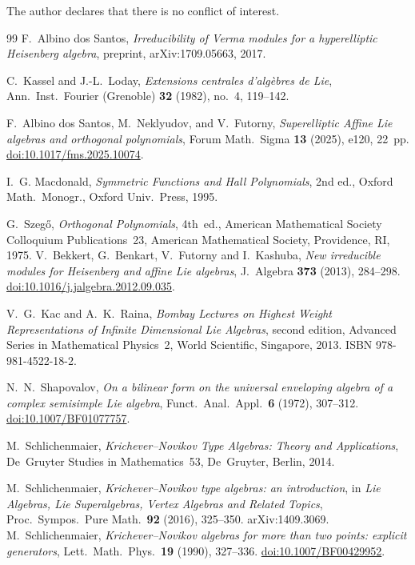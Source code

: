 \documentclass[12pt]{amsart}
\theoremstyle{plain}
\theoremstyle{definition}
\begin{document}
The author declares that there is no conflict of interest.


\begin{thebibliography}{99}
F.~Albino dos Santos,
\textit{Irreducibility of Verma modules for a hyperelliptic Heisenberg algebra},
preprint, arXiv:1709.05663, 2017.

C.~Kassel and J.-L.~Loday,
\textit{Extensions centrales d'alg\`ebres de Lie},
Ann.\ Inst.\ Fourier (Grenoble) \textbf{32} (1982), no.~4, 119--142.

F.~Albino dos Santos, M.~Neklyudov, and V.~Futorny,
\textit{Superelliptic Affine Lie algebras and orthogonal polynomials},
Forum Math.\ Sigma \textbf{13} (2025), e120, 22~pp.
\href{https://doi.org/10.1017/fms.2025.10074}{doi:10.1017/fms.2025.10074}.

I.~G. Macdonald,
\textit{Symmetric Functions and Hall Polynomials},
2nd ed., Oxford Math.\ Monogr., Oxford Univ.\ Press, 1995.

G.~Szeg\H{o},
\textit{Orthogonal Polynomials},
4th~ed., American Mathematical Society Colloquium Publications~23,
American Mathematical Society, Providence, RI, 1975.
V.~Bekkert, G.~Benkart, V.~Futorny and I.~Kashuba,
\textit{New irreducible modules for Heisenberg and affine Lie algebras},
J.~Algebra \textbf{373} (2013), 284--298.
\href{https://doi.org/10.1016/j.jalgebra.2012.09.035}{doi:10.1016/j.jalgebra.2012.09.035}.

V.~G.~Kac and A.~K.~Raina,
\textit{Bombay Lectures on Highest Weight Representations of Infinite
  Dimensional Lie Algebras},
second edition, Advanced Series in Mathematical Physics~2,
World Scientific, Singapore, 2013.
ISBN 978-981-4522-18-2.

N.~N.~Shapovalov,
\textit{On a bilinear form on the universal enveloping algebra of a
  complex semisimple Lie algebra},
Funct.\ Anal.\ Appl.\ \textbf{6} (1972), 307--312.
\href{https://doi.org/10.1007/BF01077757}{doi:10.1007/BF01077757}.

M.~Schlichenmaier,
\textit{Krichever--Novikov Type Algebras: Theory and Applications},
De~Gruyter Studies in Mathematics~53, De~Gruyter, Berlin, 2014.

M.~Schlichenmaier,
\textit{Krichever--Novikov type algebras: an introduction},
in \textit{Lie Algebras, Lie Superalgebras, Vertex Algebras and Related
  Topics}, Proc.\ Sympos.\ Pure Math.\ \textbf{92} (2016), 325--350.
arXiv:1409.3069.
M.~Schlichenmaier,
\textit{Krichever--Novikov algebras for more than two points: explicit
  generators},
Lett.\ Math.\ Phys.\ \textbf{19} (1990), 327--336.
\href{https://doi.org/10.1007/BF00429952}{doi:10.1007/BF00429952}.


\end{thebibliography}
\end{document}
